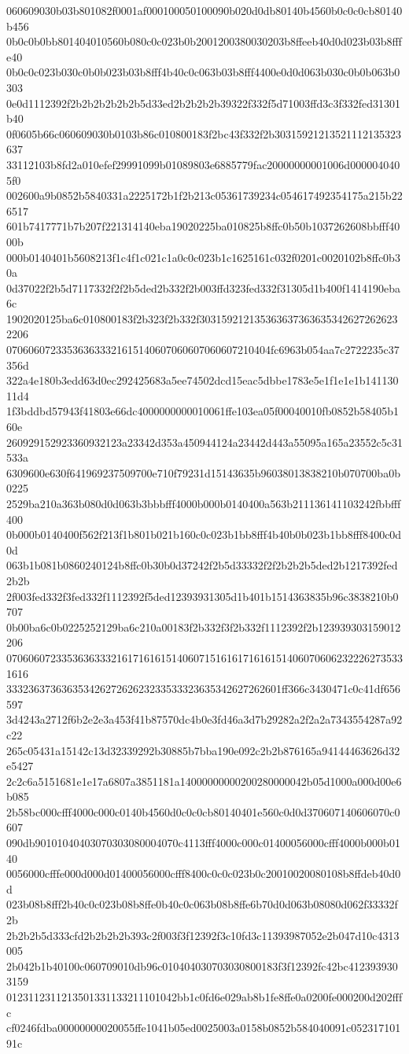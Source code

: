 060609030b03b801082f0001af000100050100090b020d0db80140b4560b0c0c0cb80140b456
0b0c0b0bb801404010560b080c0c023b0b2001200380030203b8ffeeb40d0d023b03b8fffe40
0b0c0c023b030c0b0b023b03b8fff4b40c0c063b03b8fff4400e0d0d063b030c0b0b063b0303
0e0d1112392f2b2b2b2b2b2b5d33ed2b2b2b2b39322f332f5d71003ffd3c3f332fed31301b40
0f0605b66c060609030b0103b86c010800183f2bc43f332f2b30315921213521112135323637
33112103b8fd2a010efef29991099b01089803e6885779fac20000000001006d0000040405f0
002600a9b0852b5840331a2225172b1f2b213c05361739234c054617492354175a215b226517
601b7417771b7b207f221314140eba19020225ba010825b8ffc0b50b1037262608bbfff4000b
000b0140401b5608213f1c4f1c021c1a0c0c023b1c1625161c032f0201c0020102b8ffc0b30a
0d37022f2b5d7117332f2f2b5ded2b332f2b003ffd323fed332f31305d1b400f1414190eba6c
1902020125ba6c010800183f2b323f2b332f3031592121353636373636353426272626232206
070606072335363633321615140607060607060607210404fc6963b054aa7c2722235c37356d
322a4e180b3edd63d0ec292425683a5ee74502dcd15eac5dbbe1783e5e1f1e1e1b14113011d4
1f3bddbd57943f41803e66dc4000000000010061ffe103ea05f00040010fb0852b58405b160e
260929152923360932123a23342d353a450944124a23442d443a55095a165a23552c5c31533a
6309600e630f641969237509700e710f79231d15143635b96038013838210b070700ba0b0225
2529ba210a363b080d0d063b3bbbfff4000b000b0140400a563b211136141103242fbbfff400
0b000b0140400f562f213f1b801b021b160c0c023b1bb8fff4b40b0b023b1bb8fff8400c0d0d
063b1b081b0860240124b8ffc0b30b0d37242f2b5d33332f2f2b2b2b5ded2b1217392fed2b2b
2f003fed332f3fed332f1112392f5ded12393931305d1b401b1514363835b96c3838210b0707
0b00ba6c0b0225252129ba6c210a00183f2b332f3f2b332f1112392f2b123939303159012206
0706060723353636333216171616151406071516161716161514060706062322262735331616
33323637363635342627262623233533323635342627262601ff366c3430471c0c41df656597
3d4243a2712f6b2e2e3a453f41b87570dc4b0e3fd46a3d7b29282a2f2a2a7343554287a92c22
265c05431a15142c13d32339292b30885b7bba190e092c2b2b876165a94144463626d32e5427
2c2c6a5151681e1e17a6807a3851181a14000000000200280000042b05d1000a000d00e6b085
2b58bc000cfff4000c000c0140b4560d0c0c0cb80140401e560c0d0d370607140606070c0607
090db90101040403070303080004070c4113fff4000c000c01400056000cfff4000b000b0140
0056000cfffe000d000d01400056000cfff8400c0c0c023b0c20010020080108b8ffdeb40d0d
023b08b8fff2b40c0c023b08b8ffe0b40c0c063b08b8ffe6b70d0d063b08080d062f33332f2b
2b2b2b5d333cfd2b2b2b2b393c2f003f3f12392f3c10fd3c11393987052e2b047d10c4313005
2b042b1b40100c060709010db96c010404030703030800183f3f12392fc42bc4123939303159
0123112311213501331133211101042bb1c0fd6e029ab8b1fe8ffe0a0200fe000200d202fffc
cf0246fdba00000000020055ffe1041b05ed0025003a0158b0852b584040091c05231710191c
